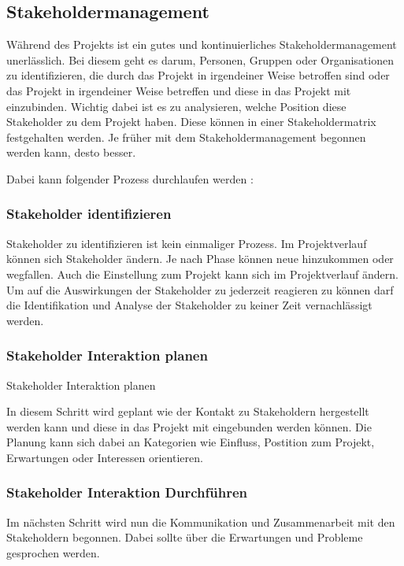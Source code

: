 \documentclass[ThesisDJ.tex]{subfiles}
\begin{document}
\subsection{Stakeholdermanagement}

Während des Projekts ist ein gutes und kontinuierliches Stakeholdermanagement unerlässlich. 
Bei diesem geht es darum, Personen, Gruppen oder Organisationen zu identifizieren, die durch das Projekt in irgendeiner Weise betroffen sind oder das
Projekt in irgendeiner Weise betreffen und diese in das Projekt mit einzubinden. Wichtig dabei ist es zu analysieren, welche Position 
diese Stakeholder zu dem Projekt haben. Diese können in einer Stakeholdermatrix festgehalten werden. 
Je früher mit dem Stakeholdermanagement begonnen werden kann, desto besser.

Dabei kann folgender Prozess durchlaufen werden \cite[S.~487]{project_management_institute_guide_2017}:

\subsubsection{Stakeholder identifizieren}
Stakeholder zu identifizieren ist kein einmaliger Prozess. Im Projektverlauf können sich Stakeholder ändern. 
Je nach Phase können neue hinzukommen oder wegfallen. Auch die Einstellung zum Projekt kann sich im Projektverlauf ändern. 
Um auf die Auswirkungen der Stakeholder zu jederzeit reagieren zu können darf die Identifikation und Analyse der Stakeholder 
zu keiner Zeit vernachlässigt werden.

\subsubsection{Stakeholder Interaktion planen}
Stakeholder Interaktion planen

In diesem Schritt wird geplant wie der Kontakt zu Stakeholdern hergestellt werden kann und diese in das Projekt mit eingebunden werden können. 
Die Planung kann sich dabei an Kategorien wie Einfluss, Postition zum Projekt, Erwartungen oder Interessen orientieren.

\subsubsection{Stakeholder Interaktion Durchführen}


Im nächsten Schritt wird nun die Kommunikation und Zusammenarbeit mit den Stakeholdern begonnen. 
Dabei sollte über die Erwartungen und Probleme gesprochen werden.
\end{document}

